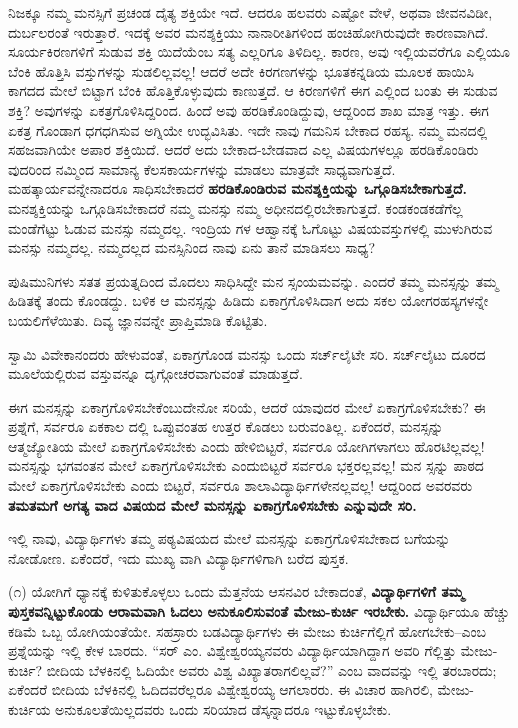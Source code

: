 ನಿಜಕ್ಕೂ ನಮ್ಮ ಮನಸ್ಸಿಗೆ ಪ್ರಚಂಡ ದೈತ್ಯ ಶಕ್ತಿಯೇ ಇದೆ. ಆದರೂ ಹಲವರು ಎಷ್ಟೋ ವೇಳೆ, ಅಥವಾ ಜೀವನವಿಡೀ, ದುರ್ಬಲರಂತೆ ಇರುತ್ತಾರೆ. ಇದಕ್ಕೆ ಅವರ ಮನಶ್ಶಕ್ತಿಯು ನಾನಾರೀತಿಗಳಿಂದ ಹಂಚಿಹೋಗಿರುವುದೇ ಕಾರಣವಾಗಿದೆ. ಸೂರ್ಯಕಿರಣಗಳಿಗೆ ಸುಡುವ ಶಕ್ತಿ ಯಿದೆಯೆಂಬ ಸತ್ಯ ಎಲ್ಲರಿಗೂ ತಿಳಿದಿಲ್ಲ. ಕಾರಣ, ಅವು ಇಲ್ಲಿಯವರೆಗೂ ಎಲ್ಲಿಯೂ ಬೆಂಕಿ ಹೊತ್ತಿಸಿ ವಸ್ತುಗಳನ್ನು ಸುಡಲಿಲ್ಲವಲ್ಲ! ಆದರೆ ಅದೇ ಕಿರಗಣಗಳನ್ನು ಭೂತಕನ್ನಡಿಯ ಮೂಲಕ ಹಾಯಿಸಿ ಕಾಗದದ ಮೇಲೆ ಬಿಟ್ಟಾಗ ಬೆಂಕಿ ಹೊತ್ತಿಕೊಳ್ಳುವುದು ಕಾಣುತ್ತದೆ. ಆ ಕಿರಣಗಳಿಗೆ ಈಗ ಎಲ್ಲಿಂದ ಬಂತು ಈ ಸುಡುವ ಶಕ್ತಿ? ಅವುಗಳನ್ನು ಏಕತ್ರಗೊಳಿಸಿದ್ದರಿಂದ. ಹಿಂದೆ ಅವು ಹರಡಿಕೊಂಡಿದ್ದುವು, ಆದ್ದರಿಂದ ಶಾಖ ಮಾತ್ರ ಇತ್ತು. ಈಗ ಏಕತ್ರ ಗೊಂಡಾಗ ಧಗಧಗಿಸುವ ಅಗ್ನಿಯೇ ಉದ್ಭವಿಸಿತು. ಇದೇ ನಾವು ಗಮನಿಸ ಬೇಕಾದ ರಹಸ್ಯ. ನಮ್ಮ ಮನದಲ್ಲಿ ಸಹಜವಾಗಿಯೇ ಅಪಾರ ಶಕ್ತಿಯಿದೆ. ಆದರೆ ಅದು ಬೇಕಾದ-ಬೇಡವಾದ ಎಲ್ಲ ವಿಷಯಗಳಲ್ಲೂ ಹರಡಿಕೊಂಡಿರು ವುದರಿಂದ ನಮ್ಮಿಂದ ಸಾಮಾನ್ಯ ಕೆಲಸಕಾರ್ಯಗಳನ್ನು ಮಾಡಲು ಮಾತ್ರವೇ ಸಾಧ್ಯವಾಗುತ್ತದೆ. ಮಹತ್ಕಾರ್ಯವನ್ನೇನಾದರೂ ಸಾಧಿಸಬೇಕಾದರೆ \textbf{ಹರಡಿಕೊಂಡಿರುವ ಮನಶ್ಶಕ್ತಿಯನ್ನು ಒಗ್ಗೂಡಿಸಬೇಕಾಗುತ್ತದೆ.} ಮನಶ್ಶಕ್ತಿಯನ್ನು ಒಗ್ಗೂಡಿಸಬೇಕಾದರೆ ನಮ್ಮ ಮನಸ್ಸು ನಮ್ಮ ಅಧೀನದಲ್ಲಿರಬೇಕಾಗುತ್ತದೆ. ಕಂಡಕಂಡಕಡೆಗೆಲ್ಲ ಮಂಡೆಗೆಟ್ಟು ಓಡುವ ಮನಸ್ಸು ನಮ್ಮದಲ್ಲ. ಇಂದ್ರಿಯ ಗಳ ಆಹ್ವಾನಕ್ಕೆ ಓಗೊಟ್ಟು ವಿಷಯವಸ್ತುಗಳಲ್ಲಿ ಮುಳುಗಿರುವ ಮನಸ್ಸು ನಮ್ಮದಲ್ಲ. ನಮ್ಮದಲ್ಲದ ಮನಸ್ಸಿನಿಂದ ನಾವು ಏನು ತಾನೆ ಮಾಡಿಸಲು ಸಾಧ್ಯ?

ಪುಷಿಮುನಿಗಳು ಸತತ ಪ್ರಯತ್ನದಿಂದ ಮೊದಲು ಸಾಧಿಸಿದ್ದೇ ಮನ ಸ್ಸಂಯಮವನ್ನು. ಎಂದರೆ ತಮ್ಮ ಮನಸ್ಸನ್ನು ತಮ್ಮ ಹಿಡಿತಕ್ಕೆ ತಂದು ಕೊಂಡದ್ದು. ಬಳಿಕ ಆ ಮನಸ್ಸನ್ನು ಹಿಡಿದು ಏಕಾಗ್ರಗೊಳಿಸಿದಾಗ ಅದು ಸಕಲ ಯೋಗರಹಸ್ಯಗಳನ್ನೇ ಬಯಲಿಗೆಳೆಯಿತು. ದಿವ್ಯ ಜ್ಞಾನವನ್ನೇ ಪ್ರಾಪ್ತಿಮಾಡಿ ಕೊಟ್ಟಿತು.

ಸ್ವಾಮಿ ವಿವೇಕಾನಂದರು ಹೇಳುವಂತೆ, ಏಕಾಗ್ರಗೊಂಡ ಮನಸ್ಸು ಒಂದು ಸರ್ಚ್​ಲೈಟೇ ಸರಿ. ಸರ್ಚ್​ಲೈಟು ದೂರದ ಮೂಲೆಯಲ್ಲಿರುವ ವಸ್ತುವನ್ನೂ ದೃಗ್ಗೋಚರವಾಗುವಂತೆ ಮಾಡುತ್ತದೆ.

ಈಗ ಮನಸ್ಸನ್ನು ಏಕಾಗ್ರಗೊಳಿಸಬೇಕೆಂಬುದೇನೋ ಸರಿಯೆ, ಆದರೆ ಯಾವುದರ ಮೇಲೆ ಏಕಾಗ್ರಗೊಳಿಸಬೇಕು? ಈ ಪ್ರಶ್ನೆಗೆ, ಸರ್ವರೂ ಏಕಕಾಲ ದಲ್ಲಿ ಒಪ್ಪುವಂತಹ ಉತ್ತರ ಕೊಡಲು ಬರುವಂತಿಲ್ಲ. ಏಕೆಂದರೆ, ಮನಸ್ಸನ್ನು ಆತ್ಮಜ್ಯೋತಿಯ ಮೇಲೆ ಏಕಾಗ್ರಗೊಳಿಸಬೇಕು ಎಂದು ಹೇಳಿಬಿಟ್ಟರೆ, ಸರ್ವರೂ ಯೋಗಿಗಳಾಗಲು ಹೊರಟಿಲ್ಲವಲ್ಲ! ಮನಸ್ಸನ್ನು ಭಗವಂತನ ಮೇಲೆ ಏಕಾಗ್ರಗೊಳಿಸಬೇಕು ಎಂದುಬಿಟ್ಟರೆ ಸರ್ವರೂ ಭಕ್ತರಲ್ಲವಲ್ಲ! ಮನ ಸ್ಸನ್ನು ಪಾಠದ ಮೇಲೆ ಏಕಾಗ್ರಗೊಳಿಸಬೇಕು ಎಂದು ಬಿಟ್ಟರೆ, ಸರ್ವರೂ ಶಾಲಾವಿದ್ಯಾರ್ಥಿಗಳೇನಲ್ಲವಲ್ಲ! ಆದ್ದರಿಂದ ಅವರವರು \textbf{ತಮತಮಗೆ ಅಗತ್ಯ ವಾದ ವಿಷಯದ ಮೇಲೆ ಮನಸ್ಸನ್ನು ಏಕಾಗ್ರಗೊಳಿಸಬೇಕು ಎನ್ನುವುದೇ ಸರಿ.}

ಇಲ್ಲಿ ನಾವು, ವಿದ್ಯಾರ್ಥಿಗಳು ತಮ್ಮ ಪಠ್ಯವಿಷಯದ ಮೇಲೆ ಮನಸ್ಸನ್ನು ಏಕಾಗ್ರಗೊಳಿಸಬೇಕಾದ ಬಗೆಯನ್ನು ನೋಡೋಣ. ಏಕೆಂದರೆ, ಇದು ಮುಖ್ಯ ವಾಗಿ ವಿದ್ಯಾರ್ಥಿಗಳಿಗಾಗಿ ಬರೆದ ಪುಸ್ತಕ.

(೧) ಯೋಗಿಗೆ ಧ್ಯಾನಕ್ಕೆ ಕುಳಿತುಕೊಳ್ಳಲು ಒಂದು ಮೆತ್ತನೆಯ ಆಸನವಿರ ಬೇಕಾದಂತೆ, \textbf{ವಿದ್ಯಾರ್ಥಿಗಳಿಗೆ ತಮ್ಮ ಪುಸ್ತಕವನ್ನಿಟ್ಟುಕೊಂಡು ಆರಾಮವಾಗಿ ಓದಲು ಅನುಕೂಲಿಸುವಂತೆ ಮೇಜು-ಕುರ್ಚಿ ಇರಬೇಕು.} ವಿದ್ಯಾರ್ಥಿಯೂ ಹೆಚ್ಚು ಕಡಿಮೆ ಒಬ್ಬ ಯೋಗಿಯಂತೆಯೇ. ಸಹಸ್ರಾರು ಬಡವಿದ್ಯಾರ್ಥಿಗಳು ಈ ಮೇಜು ಕುರ್ಚಿಗೆಲ್ಲಿಗೆ ಹೋಗಬೇಕು–ಎಂಬ ಪ್ರಶ್ನೆಯನ್ನು ಇಲ್ಲಿ ಕೇಳ ಬಾರದು. “ಸರ್ ಎಂ. ವಿಶ್ವೇಶ್ವರಯ್ಯನವರು ವಿದ್ಯಾರ್ಥಿಯಾಗಿದ್ದಾಗ ಅವರಿ ಗೆಲ್ಲಿತ್ತು ಮೇಜು-ಕುರ್ಚಿ? ಬೀದಿಯ ಬೆಳಕಿನಲ್ಲಿ ಓದಿಯೇ ಅವರು ವಿಶ್ವ ವಿಖ್ಯಾತರಾಗಲಿಲ್ಲವೆ?” ಎಂಬ ವಾದವನ್ನು ಇಲ್ಲಿ ತರಬಾರದು; ಏಕೆಂದರೆ ಬೀದಿಯ ಬೆಳಕಿನಲ್ಲಿ ಓದಿದವರೆಲ್ಲರೂ ವಿಶ್ವೇಶ್ವರಯ್ಯ ಆಗಲಾರರು. ಈ ವಿಚಾರ ಹಾಗಿರಲಿ, ಮೇಜು-ಕುರ್ಚಿಯ ಅನುಕೂಲತೆಯಿಲ್ಲದವರು ಒಂದು ಸರಿಯಾದ ಡೆಸ್ಕನ್ನಾದರೂ ಇಟ್ಟುಕೊಳ್ಳಬೇಕು.

